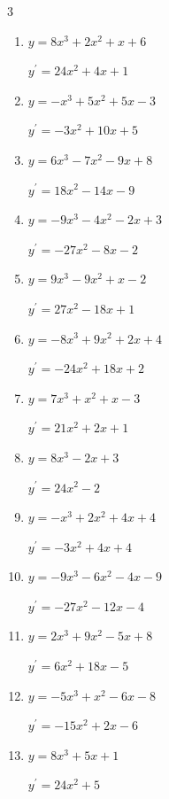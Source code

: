 \begin{multicols}{3}
\begin{enumerate}
\resetques

  \item $y=8x^{3}+2x^{2}+x+6$

        $\displaystyle y^{\prime}=24x^{2}+4x+1$

  \item $y=-x^{3}+5x^{2}+5x-3$

        $\displaystyle y^{\prime}=-3x^{2}+10x+5$

  \item $y=6x^{3}-7x^{2}-9x+8$

        $\displaystyle y^{\prime}=18x^{2}-14x-9$

  \item $y=-9x^{3}-4x^{2}-2x+3$

        $\displaystyle y^{\prime}=-27x^{2}-8x-2$

  \item $y=9x^{3}-9x^{2}+x-2$

        $\displaystyle y^{\prime}=27x^{2}-18x+1$

  \item $y=-8x^{3}+9x^{2}+2x+4$

        $\displaystyle y^{\prime}=-24x^{2}+18x+2$

  \item $y=7x^{3}+x^{2}+x-3$

        $\displaystyle y^{\prime}=21x^{2}+2x+1$

  \item $y=8x^{3}-2x+3$

        $\displaystyle y^{\prime}=24x^{2}-2$

  \item $y=-x^{3}+2x^{2}+4x+4$

        $\displaystyle y^{\prime}=-3x^{2}+4x+4$

  \item $y=-9x^{3}-6x^{2}-4x-9$

        $\displaystyle y^{\prime}=-27x^{2}-12x-4$

  \item $y=2x^{3}+9x^{2}-5x+8$

        $\displaystyle y^{\prime}=6x^{2}+18x-5$

  \item $y=-5x^{3}+x^{2}-6x-8$

        $\displaystyle y^{\prime}=-15x^{2}+2x-6$

  \item $y=8x^{3}+5x+1$

        $\displaystyle y^{\prime}=24x^{2}+5$


\end{enumerate}
\end{multicols}
